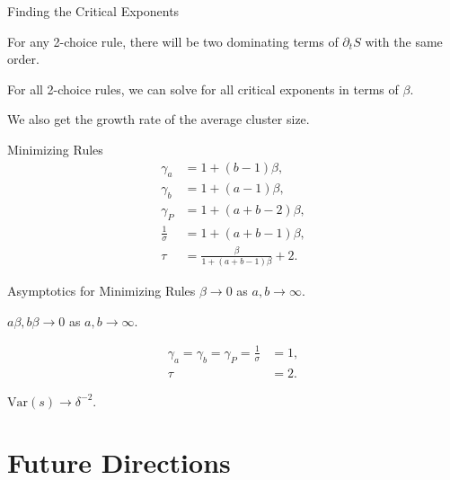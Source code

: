\documentclass{beamer}
\begin{document}
\begin{frame}{Finding the Critical Exponents}
	\begin{theorem}
		For any 2-choice rule, there will be two dominating terms of $\partial_t S$ with the same order.
	\end{theorem}

	\pause
	\vspace{5mm}
	For all 2-choice rules, we can solve for all critical exponents in terms of $\beta$.
	
	\vspace{5mm}
	We also get the growth rate of the average cluster size.
\end{frame}

\begin{frame}{Minimizing Rules}
	\begin{align*}
		\gamma_a &= 1+(b-1)\beta, \\
		\gamma_b &= 1+(a-1)\beta, \\
		\gamma_{P} &= 1+(a+b-2)\beta, \\
		\frac{1}{\sigma} &= 1+(a+b-1)\beta, \\
		\tau &= \frac{\beta}{1+(a+b-1)\beta} +2.
	\end{align*}
\end{frame}

\begin{frame}{Asymptotics for Minimizing Rules}
	$\beta\to 0$ as $a,b \to \infty$.

	\vspace{5mm}
	\begin{theorem}
		$a \beta, b\beta\to 0$ as $a,b \to \infty$.
	\end{theorem}

	\pause
	\begin{align*}
		\gamma_{a}=\gamma_{b}=\gamma_{P}=\frac{1}{\sigma} &= 1, \\
		\tau &= 2.
	\end{align*}

	\vspace{5mm}
	\pause
	$\text{Var}(s) \to \delta^{-2}$.
\end{frame}

\section{Future Directions}
\end{document}
